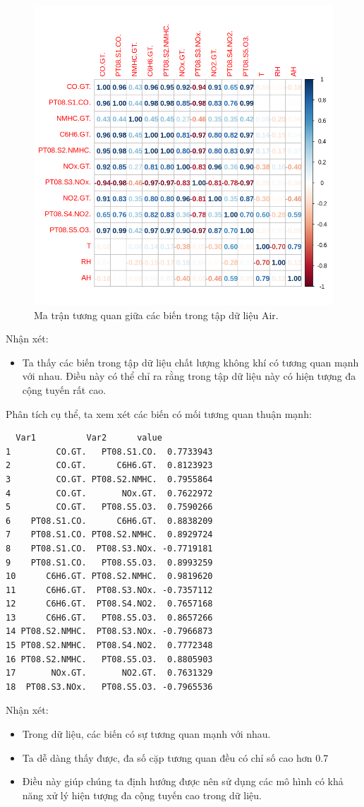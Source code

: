 \begin{figure}[H]
    \centering
    \includegraphics[width=0.75\columnwidth]{air_figures/air_corr.png}
    \caption{Ma trận tương quan giữa các biến trong tập dữ liệu Air.}
    \label{fig:air_corr}
\end{figure}
Nhận xét:
\begin{itemize}
    \item Ta thấy các biến trong tập dữ liệu chất lượng không khí có tương quan mạnh với nhau. Điều này có thể chỉ ra rằng trong tập dữ liệu này có hiện tượng đa cộng tuyến rất cao.
\end{itemize}
 Phân tích cụ thể, ta xem xét các biến có mối tương quan thuận mạnh:
 \begin{lstlisting}
  Var1          Var2      value
1         CO.GT.   PT08.S1.CO.  0.7733943
2         CO.GT.      C6H6.GT.  0.8123923
3         CO.GT. PT08.S2.NMHC.  0.7955864
4         CO.GT.       NOx.GT.  0.7622972
5         CO.GT.   PT08.S5.O3.  0.7590266
6    PT08.S1.CO.      C6H6.GT.  0.8838209
7    PT08.S1.CO. PT08.S2.NMHC.  0.8929724
8    PT08.S1.CO.  PT08.S3.NOx. -0.7719181
9    PT08.S1.CO.   PT08.S5.O3.  0.8993259
10      C6H6.GT. PT08.S2.NMHC.  0.9819620
11      C6H6.GT.  PT08.S3.NOx. -0.7357112
12      C6H6.GT.  PT08.S4.NO2.  0.7657168
13      C6H6.GT.   PT08.S5.O3.  0.8657266
14 PT08.S2.NMHC.  PT08.S3.NOx. -0.7966873
15 PT08.S2.NMHC.  PT08.S4.NO2.  0.7772348
16 PT08.S2.NMHC.   PT08.S5.O3.  0.8805903
17       NOx.GT.       NO2.GT.  0.7631329
18  PT08.S3.NOx.   PT08.S5.O3. -0.7965536
 \end{lstlisting}
 Nhận xét:
 \begin{itemize}
     \item Trong dữ liệu, các biến có sự tương quan mạnh với nhau.
     \item  Ta dễ dàng thấy được, đa số cặp tương quan đều có chỉ số cao hơn 0.7
     \item   Điều này giúp chúng ta định hướng được nên sử dụng các mô hình có khả năng xử lý hiện tượng đa cộng tuyến cao trong dữ liệu.
 \end{itemize}

